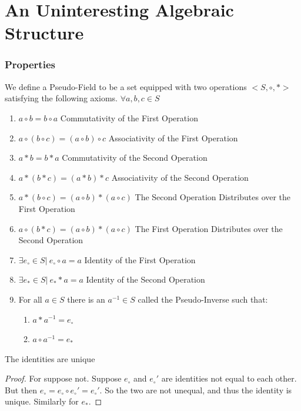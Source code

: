 \documentclass[crop=false,class=book,oneside]{standalone}
\begin{document}
        \section{An Uninteresting Algebraic Structure}
            \subsubsection{Properties}
            We define a Pseudo-Field to be a set equipped with two operations $<S,\circ, *>$ satisfying the following axioms.
            $\forall a,b,c \in S$
            \begin{enumerate}
                \item $a\circ b = b\circ a$ \hfill Commutativity of the First Operation
                \item $a\circ (b\circ c)=(a \circ b)\circ c$ \hfill Associativity of the First Operation
                \item $a*b = b*a$ \hfill Commutativity of the Second Operation
                \item $a*(b*c) = (a*b)*c$ \hfill Associativity of the Second Operation
                \item $a*(b\circ c)=(a\circ b)*(a\circ c)$ \hfill The Second Operation Distributes over the First Operation
                \item $a\circ (b*c) = (a\circ b)*(a\circ c)$ \hfill The First Operation Distributes over the Second Operation
                \item $\exists e_{\circ}\in S|\ e_{\circ}\circ a = a$ \hfill Identity of the First Operation
                \item $\exists e_{*} \in S|\ e_{*}*a = a$ \hfill Identity of the Second Operation
                \item For all $a\in S$ there is an $a^{-1}\in S$ called the Pseudo-Inverse such that:
                \begin{enumerate}
                    \item $a*a^{-1} = e_{\circ}$
                    \item $a\circ a^{-1}=e_{*}$
                \end{enumerate}
            \end{enumerate}
            \begin{theorem} The identities are unique
            \end{theorem}
            \begin{proof} For suppose not. Suppose $e_{\circ}$ and $e_{\circ}'$ are identities not equal to each other. But then $e_{\circ}=e_{\circ}\circ e_{\circ}'=e_{\circ}'$. So the two are not unequal, and thus the identity is unique. Similarly for $e_{*}$.
            \end{proof}
\end{document}
